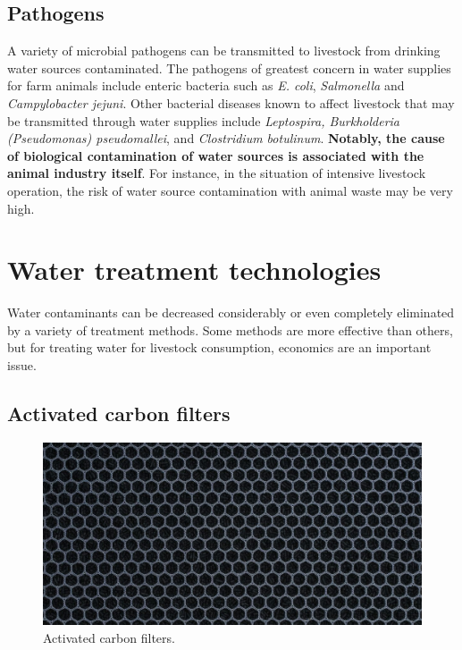 \documentclass[]{book}
\begin{document}
\hypertarget{pathogens}{%
\subsection{Pathogens}\label{pathogens}}

A variety of microbial pathogens can be transmitted to livestock from drinking water sources contaminated. The pathogens of greatest concern in water supplies for farm animals include enteric bacteria such as \emph{E. coli}, \emph{Salmonella} and \emph{Campylobacter jejuni}. Other bacterial diseases known to affect livestock that may be transmitted through water supplies include \emph{Leptospira, Burkholderia (Pseudomonas) pseudomallei}, and \emph{Clostridium botulinum}. \textbf{Notably, the cause of biological contamination of water sources is associated with the animal industry itself}. For instance, in the situation of intensive livestock operation, the risk of water source contamination with animal waste may be very high.

\hypertarget{water-treatment-technologies}{%
\section{Water treatment technologies}\label{water-treatment-technologies}}

Water contaminants can be decreased considerably or even completely eliminated by a variety of treatment methods. Some methods are more effective than others, but for treating water for livestock consumption, economics are an important issue.

\hypertarget{activated-carbon-filters}{%
\subsection{Activated carbon filters}\label{activated-carbon-filters}}

\begin{figure}

{\centering \includegraphics[width=1\linewidth,height=1\textheight]{figures/activated-carbon-filter} 

}

\caption{Activated carbon filters.}\label{fig:carbon-filter}
\end{figure}
\end{document}
